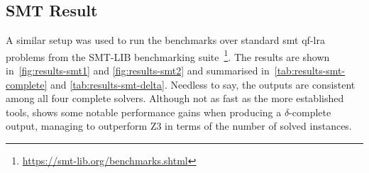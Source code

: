 \documentclass[runningheads]{llncs}
\begin{document}
\subsection*{SMT Result}

A similar setup was used to run the benchmarks over standard \gls{smt} \gls{qf-lra} problems from the SMT-LIB benchmarking suite~\footnote{\url{https://smt-lib.org/benchmarks.shtml}}.
The results are shown in~\autoref{fig:results-smt1} and \autoref{fig:results-smt2} and summarised in~\autoref{tab:results-smt-complete} and \autoref{tab:results-smt-delta}.
Needless to say, the outputs are consistent among all four complete solvers.
Although not as fast as the more established tools, \dlinear shows some notable performance gains when producing a $\delta$-complete output, managing to outperform Z3 in terms of the number of solved instances.
\end{document}
